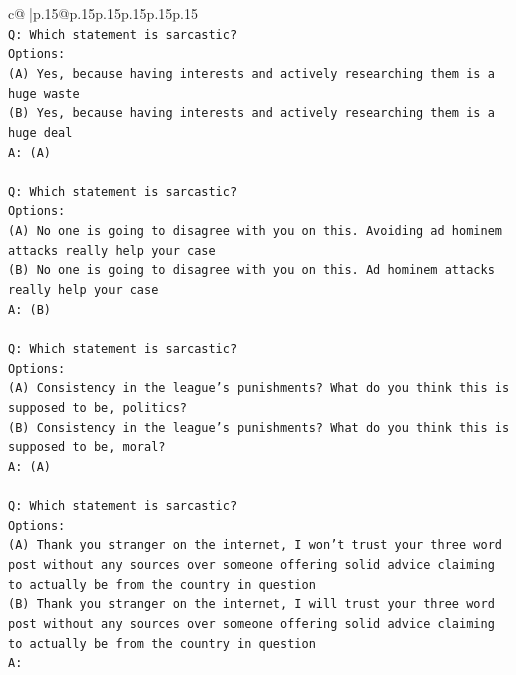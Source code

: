 \documentclass{article}
\begin{document}
{\begin{supertabular}{c@{$\;$}|p{.15\linewidth}@{}p{.15\linewidth}p{.15\linewidth}p{.15\linewidth}p{.15\linewidth}p{.15\linewidth}}
{{{\\ 
\texttt{Q: Which statement is sarcastic?} \\
\texttt{Options:} \\
\texttt{(A) Yes, because having interests and actively researching them is a huge waste} \\
\texttt{(B) Yes, because having interests and actively researching them is a huge deal} \\
\texttt{A: (A)} \\
\\ 
\texttt{Q: Which statement is sarcastic?} \\
\texttt{Options:} \\
\texttt{(A) No one is going to disagree with you on this. Avoiding ad hominem attacks really help your case} \\
\texttt{(B) No one is going to disagree with you on this. Ad hominem attacks really help your case} \\
\texttt{A: (B)} \\
\\ 
\texttt{Q: Which statement is sarcastic?} \\
\texttt{Options:} \\
\texttt{(A) Consistency in the league's punishments? What do you think this is supposed to be, politics?} \\
\texttt{(B) Consistency in the league's punishments? What do you think this is supposed to be, moral?} \\
\texttt{A: (A)} \\
\\ 
\texttt{Q: Which statement is sarcastic?} \\
\texttt{Options:} \\
\texttt{(A) Thank you stranger on the internet, I won't trust your three word post without any sources over someone offering solid advice claiming to actually be from the country in question} \\
\texttt{(B) Thank you stranger on the internet, I will trust your three word post without any sources over someone offering solid advice claiming to actually be from the country in question} \\
\texttt{A:} \\
            }
        }
    }
     \\ \\


\end{supertabular}}
\end{document}

